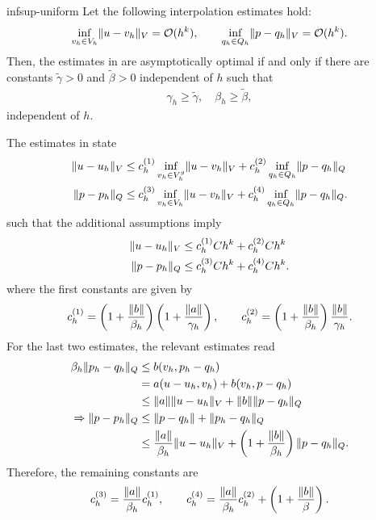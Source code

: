 \begin{Problem}{infsup-uniform}
  Let the following interpolation estimates hold:
  \begin{gather*}
    \inf_{v_h\in V_h}\lVert u-v_h\rVert_V = \mathcal O(h^k),
    \qquad
    \inf_{q_h\in Q_h}\lVert p-q_h\rVert_V = \mathcal O(h^k).
  \end{gather*}
  Then, the estimates in 
  are asymptotically optimal if and only if there are
  constants $\tilde \gamma>0$ and $\tilde \beta>0$ independent of
  $h$ such that
  \begin{gather}
    \label{eq:galerkin:14}
    \gamma_h\ge \tilde\gamma,\quad\beta_h\ge\tilde\beta,
  \end{gather}
  independent of $h$.
\begin{solution}
  The estimates in  state
  \begin{align*}
    \lVert u-u_h\rVert_V &\le c_h^{(1)} \inf_{v_h\in V_h^g}\lVert u-v_h\rVert_V
	      + c_h^{(2)} \inf_{q_h\in Q_h}\lVert p-q_h\rVert_Q \\
    \lVert p-p_h\rVert_Q &\le c_h^{(3)} \inf_{v_h\in V_h}\lVert u-v_h\rVert_V
	      + c_h^{(4)} \inf_{q_h\in Q_h}\lVert p-q_h\rVert_Q.
  \end{align*}
  such that the additional assumptions imply
  \begin{align*}
    \lVert u-u_h\rVert_V &\le c_h^{(1)} C h^k + c_h^{(2)} C h^k \\
    \lVert p-p_h\rVert_Q &\le c_h^{(3)} C h^k + c_h^{(4)} C h^k.
  \end{align*}
    where the first constants are given by
  \begin{align*}
    c_h^{(1)} = \left(1+\frac{\lVert b\rVert}{\beta_h}\right)
    \left(1+\frac{\lVert a\rVert}{\gamma_h}\right),
    \qquad
    c_h^{(2)} = \left(1+\frac{\lVert b\rVert}{\beta_h}\right)
    \frac{\lVert b\rVert}{\gamma_h}.
  \end{align*}
  For the last two estimates, the relevant estimates read
  \begin{align*}
    \beta_h \lVert p_h-q_h\rVert_Q
    &\le b(v_h,p_h-q_h)\\
    & = a(u-u_h, v_h) + b(v_h, p-q_h)\\
    &\le \lVert a\rVert \lVert u-u_h\rVert_V + \lVert b\rVert \lVert p-q_h\rVert_Q\\
    \Rightarrow \lVert p-p_h\rVert_Q
    &\le \lVert p-q_h\rVert + \lVert p_h-q_h\rVert_Q \\
    &\le \frac{\lVert a\rVert}{\beta_h} \lVert u-u_h\rVert_V + \left(1+\frac{\lVert b\rVert}{\beta_h}\right) \lVert p-q_h\rVert_Q.
  \end{align*}
  Therefore, the remaining constants are
  \begin{align*}
    c_h^{(3)} = \frac{\lVert a\rVert}{\beta_h}c_h^{(1)}, \qquad
    c_h^{(4)} = \frac{\lVert a\rVert}{\beta_h}c_h^{(2)}+\left(1+\frac{\lVert b\rVert}{\beta}\right).
  \end{align*}
\end{solution}
\end{Problem}

